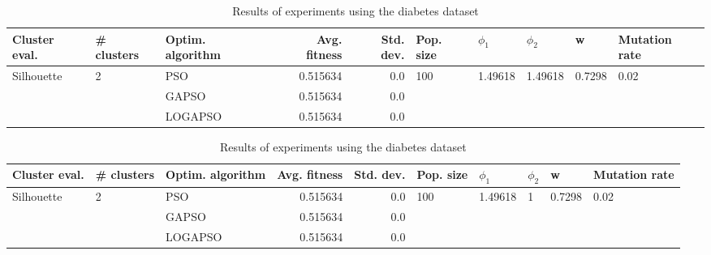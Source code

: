 \documentclass{article}
\begin{document}
\begin{table}
\centering
\caption{Results of experiments using the diabetes dataset}
\begin{tabular}{lllrrlllll}
\toprule
              Cluster eval. &        \# clusters & Optim. algorithm &  Avg. fitness &  Std. dev. &            Pop. size &               $\phi_{1}$ &               $\phi_{2}$ &                       w &         Mutation rate \\
\midrule
\multirow{3}{*}{Silhouette} & \multirow{3}{*}{2} &              PSO &      0.515634 &        0.0 & \multirow{3}{*}{100} & \multirow{3}{*}{1.49618} & \multirow{3}{*}{1.49618} & \multirow{3}{*}{0.7298} & \multirow{3}{*}{0.02} \\
                            &                    &            GAPSO &      0.515634 &        0.0 &                      &                          &                          &                         &                       \\
                            &                    &          LOGAPSO &      0.515634 &        0.0 &                      &                          &                          &                         &                       \\
\bottomrule
\end{tabular}
\end{table}
\begin{table}
\centering
\caption{Results of experiments using the diabetes dataset}
\begin{tabular}{lllrrlllll}
\toprule
              Cluster eval. &        \# clusters & Optim. algorithm &  Avg. fitness &  Std. dev. &            Pop. size &               $\phi_{1}$ &         $\phi_{2}$ &                       w &         Mutation rate \\
\midrule
\multirow{3}{*}{Silhouette} & \multirow{3}{*}{2} &              PSO &      0.515634 &        0.0 & \multirow{3}{*}{100} & \multirow{3}{*}{1.49618} & \multirow{3}{*}{1} & \multirow{3}{*}{0.7298} & \multirow{3}{*}{0.02} \\
                            &                    &            GAPSO &      0.515634 &        0.0 &                      &                          &                    &                         &                       \\
                            &                    &          LOGAPSO &      0.515634 &        0.0 &                      &                          &                    &                         &                       \\
\bottomrule
\end{tabular}
\end{table}
\end{document}

